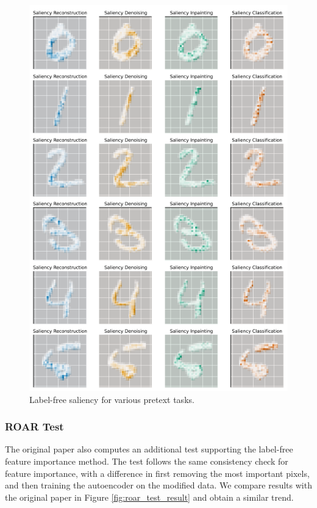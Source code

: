\begin{figure}[H]
    \centering
    \includegraphics[width=14cm]{images/saliency_pretext.png}
    \caption{Label-free saliency for various pretext tasks.}
    \label{fig:saliency_maps_pretext}
\end{figure}

\subsubsection{ROAR Test}

The original paper also computes an additional test supporting the label-free feature importance method. The test follows the same consistency check for feature importance, with a difference in first removing the most important pixels, and then training the autoencoder on the modified data. We compare results with the original paper in Figure \ref{fig:roar_test_result} and obtain a similar trend.

